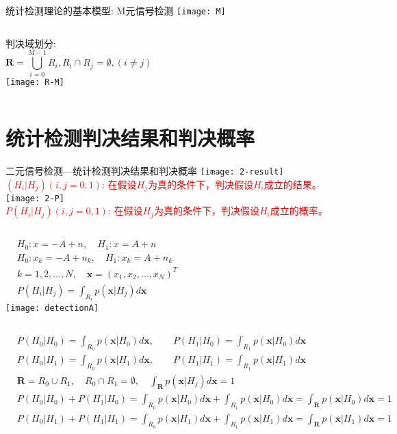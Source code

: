 \begin{frame}{统计检测理论的基本模型: M元信号检测}
\texttt{[image: M]}
\newline
\begin{columns}
    判决域划分:
    \[\bm{R}=\bigcup_{i=0}^{M-1}R_i, R_i\cap R_j=\emptyset, (i\ne j) \]
	\texttt{[image: R-M]}
\end{columns}
\end{frame}

\section{统计检测判决结果和判决概率}

\begin{frame}{二元信号检测---统计检测判决结果和判决概率}
\texttt{[image: 2-result]}\\
\textcolor{red}{$(H_i|H_j)(i,j=0,1)$: 在假设$H_j$为真的条件下，判决假设$H_i$成立的结果。}
\newline
\texttt{[image: 2-P]}\\
\textcolor{red}{$P(H_i|H_j)(i,j=0,1)$: 在假设$H_j$为真的条件下，判决假设$H_i$成立的概率。}
\end{frame}

\begin{frame}
\begin{columns}
	\begin{align*}
	&H_0: x=-A+n,\quad H_1: x=A+n\\
	&H_0: x_k=-A+n_k,\quad H_1: x_k=A+n_k\\
	&k=1,2,\dots,N,\quad \bm{x}=(x_1,x_2,\dots,x_N)^{T}\\
	&P(H_i|H_j)=\int_{R_i}p(\bm{x}|H_j)d\bm{x}
	\end{align*}
	\texttt{[image: detectionA]}
\end{columns}
\begin{align*}
&P(H_0|H_0)=\int_{R_0}p(\bm{x}|H_0)d\bm{x},\qquad P(H_1|H_0)=\int_{R_1}p(\bm{x}|H_0)d\bm{x}\\
&P(H_0|H_1)=\int_{R_0}p(\bm{x}|H_1)d\bm{x},\qquad P(H_1|H_1)=\int_{R_1}p(\bm{x}|H_1)d\bm{x}\\
&\bm{R}=R_0\cup R_1,\quad R_0\cap R_1=\emptyset, \quad \int_{\bm{R}}p(\bm{x}|H_j)d\bm{x}=1\\
&P(H_0|H_0)+P(H_1|H_0)=\int_{R_0}p(\bm{x}|H_0)d\bm{x}+\int_{R_1}p(\bm{x}|H_0)d\bm{x}=\int_{\bm{R}}p(\bm{x}|H_0)d\bm{x}=1\\
&P(H_0|H_1)+P(H_1|H_1)=\int_{R_0}p(\bm{x}|H_1)d\bm{x}+\int_{R_1}p(\bm{x}|H_1)d\bm{x}=\int_{\bm{R}}p(\bm{x}|H_1)d\bm{x}=1
\end{align*}
\end{frame}

